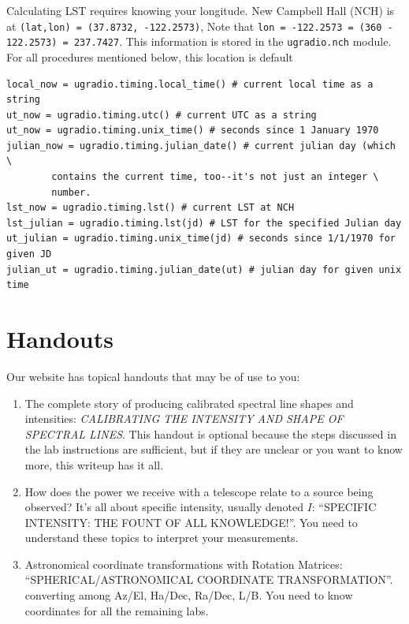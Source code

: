 \documentclass[11pt,preprint]{aastex}
\begin{document}
Calculating LST requires knowing your
longitude. New Campbell Hall (NCH) is at 
{\tt (lat,lon) = (37.8732, -122.2573)},  Note that {\tt lon = -122.2573 = (360 - 122.2573) = 237.7427}. 
This information is stored in the {\tt ugradio.nch} module.
For all procedures mentioned below, this location is default

\begin{verbatim}
local_now = ugradio.timing.local_time() # current local time as a string
ut_now = ugradio.timing.utc() # current UTC as a string
ut_now = ugradio.timing.unix_time() # seconds since 1 January 1970
julian_now = ugradio.timing.julian_date() # current julian day (which \
        contains the current time, too--it's not just an integer \
        number. 
lst_now = ugradio.timing.lst() # current LST at NCH
lst_julian = ugradio.timing.lst(jd) # LST for the specified Julian day                       
ut_julian = ugradio.timing.unix_time(jd) # seconds since 1/1/1970 for given JD
julian_ut = ugradio.timing.julian_date(ut) # julian day for given unix time
\end{verbatim}

\section{Handouts} \label{handouts}

\noindent
Our website has topical handouts that may be of use to you:
\begin{enumerate}

\item The complete story of producing calibrated spectral line shapes
  and intensities: {\it CALIBRATING THE INTENSITY AND SHAPE OF SPECTRAL
  LINES}. This handout is optional because the steps discussed in
  the lab instructions are sufficient, but
  if they are unclear or you want to know more, this writeup has it all.

\item How does the power we receive with a telescope relate to a source being
  observed? It's all about specific intensity, usually denoted $I$:
  ``SPECIFIC INTENSITY: THE FOUNT OF ALL KNOWLEDGE!''. 
  You need to understand these topics to interpret your measurements.

\item Astronomical coordinate transformations with Rotation Matrices:
  ``SPHERICAL/ASTRONOMICAL COORDINATE
  TRANSFORMATION''. converting among Az/El, Ha/Dec, Ra/Dec, L/B. 
    You need to know coordinates for all the remaining labs.

\end{enumerate}
\end{document}
